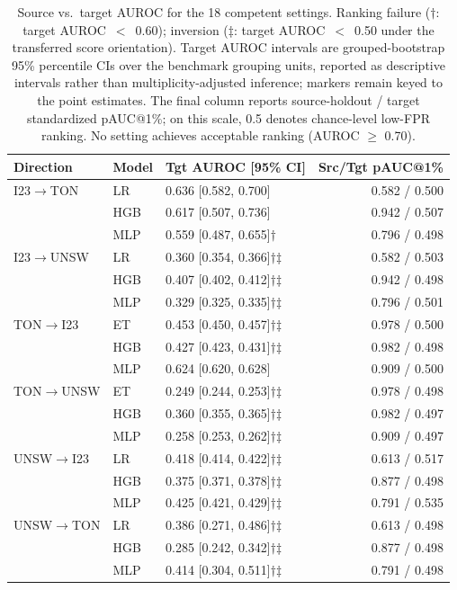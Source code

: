 \begin{table}[htbp]
\centering
\scriptsize
\setlength{\tabcolsep}{3pt}
\caption{Source vs.\ target AUROC for the 18 competent settings. Ranking failure ($\dagger$: target AUROC~$<$~0.60); inversion ($\ddagger$: target AUROC~$<$~0.50 under the transferred score orientation). Target AUROC intervals are grouped-bootstrap 95\% percentile CIs over the benchmark grouping units, reported as descriptive intervals rather than multiplicity-adjusted inference; markers remain keyed to the point estimates. The final column reports source-holdout / target standardized pAUC@1\%; on this scale, 0.5 denotes chance-level low-FPR ranking. No setting achieves acceptable ranking (AUROC $\geq$ 0.70).}
\label{tab:collapse}
\begin{tabular}{llp{1.40in}r}
\toprule
Direction & Model & Tgt AUROC [95\% CI] & Src/Tgt pAUC@1\% \\
\midrule
I23$\to$TON & LR & 0.636 [0.582, 0.700] & 0.582 / 0.500 \\
 & HGB & 0.617 [0.507, 0.736] & 0.942 / 0.507 \\
 & MLP & 0.559 [0.487, 0.655]$\dagger$ & 0.796 / 0.498 \\
I23$\to$UNSW & LR & 0.360 [0.354, 0.366]$\dagger$$\ddagger$ & 0.582 / 0.503 \\
 & HGB & 0.407 [0.402, 0.412]$\dagger$$\ddagger$ & 0.942 / 0.498 \\
 & MLP & 0.329 [0.325, 0.335]$\dagger$$\ddagger$ & 0.796 / 0.501 \\
TON$\to$I23 & ET & 0.453 [0.450, 0.457]$\dagger$$\ddagger$ & 0.978 / 0.500 \\
 & HGB & 0.427 [0.423, 0.431]$\dagger$$\ddagger$ & 0.982 / 0.498 \\
 & MLP & 0.624 [0.620, 0.628] & 0.909 / 0.500 \\
TON$\to$UNSW & ET & 0.249 [0.244, 0.253]$\dagger$$\ddagger$ & 0.978 / 0.498 \\
 & HGB & 0.360 [0.355, 0.365]$\dagger$$\ddagger$ & 0.982 / 0.497 \\
 & MLP & 0.258 [0.253, 0.262]$\dagger$$\ddagger$ & 0.909 / 0.497 \\
UNSW$\to$I23 & LR & 0.418 [0.414, 0.422]$\dagger$$\ddagger$ & 0.613 / 0.517 \\
 & HGB & 0.375 [0.371, 0.378]$\dagger$$\ddagger$ & 0.877 / 0.498 \\
 & MLP & 0.425 [0.421, 0.429]$\dagger$$\ddagger$ & 0.791 / 0.535 \\
UNSW$\to$TON & LR & 0.386 [0.271, 0.486]$\dagger$$\ddagger$ & 0.613 / 0.498 \\
 & HGB & 0.285 [0.242, 0.342]$\dagger$$\ddagger$ & 0.877 / 0.498 \\
 & MLP & 0.414 [0.304, 0.511]$\dagger$$\ddagger$ & 0.791 / 0.498 \\
\bottomrule
\end{tabular}
\end{table}
